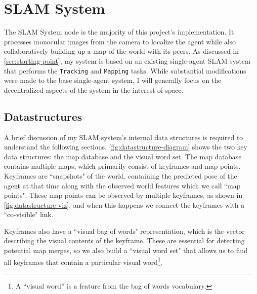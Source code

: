 \section{SLAM System}
\label{sec:slam-system}
The SLAM System node is the majority of this project's implementation. It processes monocular images from the camera to localize the agent while also collaboratively building up a map of the world with its peers. As discussed in \autoref{sec:starting-point}, my system is based on an existing single-agent SLAM system that performs the \texttt{Tracking} and \texttt{Mapping} tasks. While substantial modifications were made to the base single-agent system, I will generally focus on the decentralized aspects of the system in the interest of space.

\subsection{Datastructures}
\label{sec:datastructures}
A brief discussion of my SLAM system's internal data structures is required to understand the following sections. \autoref{fig:datastructure-diagram} shows the two key data structures: the map database and the visual word set. The map database contains multiple maps, which primarily consist of keyframes and map points. Keyframes are ``snapshots" of the world, containing the predicted pose of the agent at that time along with the observed world features which we call ``map points". These map points can be observed by multiple keyframes, as shown in \autoref{fig:datastructure-viz}, and when this happens we connect the keyframes with a ``co-visible" link.

Keyframes also have a ``visual bag of words" representation, which is the vector describing the visual contents of the keyframe. These are essential for detecting potential map merges, so we also build a ``visual word set" that allows us to find all keyframes that contain a particular visual word\footnote[1]{A ``visual word'' is a feature from the bag of words vocabulary.}.


